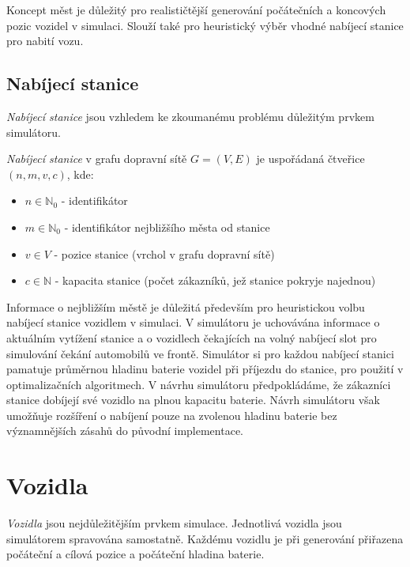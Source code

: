 Koncept měst je důležitý pro realističtější generování počátečních
a koncových pozic vozidel v simulaci. Slouží také pro heuristický
výběr vhodné nabíjecí stanice pro nabití vozu.


\subsection{Nabíjecí stanice}
\emph{Nabíjecí stanice} jsou vzhledem ke zkoumanému problému důležitým 
prvkem simulátoru.

\begin{defn}\label{def:nabijeci_stanice}
    \emph{Nabíjecí stanice} v grafu dopravní sítě $G=(V, E)$ je uspořádaná 
    čtveřice $(n, m, v, c)$, kde:
    \begin{itemize}
        \item $n \in \mathbb{N}_0$ - identifikátor
        \item $m \in \mathbb{N}_0$ - identifikátor nejbližšího města od stanice
        \item $v \in V$ - pozice stanice (vrchol v grafu dopravní sítě)
        \item $c \in \mathbb{N}$ - kapacita stanice (počet zákazníků, 
        jež stanice pokryje najednou)
    \end{itemize}
\end{defn}

Informace o nejbližším městě je důležitá především pro heuristickou volbu 
nabíjecí stanice vozidlem v simulaci. V simulátoru je uchovávána informace
o aktuálním vytížení stanice a o vozidlech čekajících na volný nabíjecí slot pro 
simulování čekání automobilů ve frontě. Simulátor si pro každou nabíjecí 
stanici pamatuje průměrnou hladinu baterie vozidel při příjezdu do stanice,
pro použití v optimalizačních algoritmech. 
V návrhu simulátoru předpokládáme, že zákazníci stanice dobíjejí své vozidlo 
na plnou kapacitu baterie. Návrh simulátoru však umožňuje rozšíření o 
nabíjení pouze na zvolenou hladinu baterie bez významnějších zásahů do původní
implementace.


\section{Vozidla}
\label{sec:vozidla}

\emph{Vozidla} jsou nejdůležitějším prvkem simulace. Jednotlivá vozidla jsou 
simulátorem spravována samostatně. Každému vozidlu je při generování přiřazena
počáteční a cílová pozice a počáteční hladina baterie.


